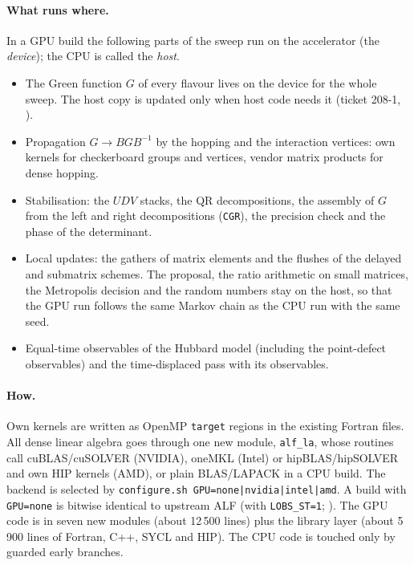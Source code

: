 \paragraph{What runs where.} In a GPU build the following parts of the sweep run on the accelerator (the \emph{device}); the CPU is called the \emph{host}.
\begin{itemize}
\item The Green function $G$ of every flavour lives on the device for the whole sweep. The host copy is updated only when host code needs it (ticket 208-1, ).
\item Propagation $G\to B G B^{-1}$ by the hopping and the interaction vertices: own kernels for checkerboard groups and vertices, vendor matrix products for dense hopping.
\item Stabilisation: the $UDV$ stacks, the QR decompositions, the assembly of $G$ from the left and right decompositions (\texttt{CGR}), the precision check and the phase of the determinant.
\item Local updates: the gathers of matrix elements and the flushes of the delayed and submatrix schemes. The proposal, the ratio arithmetic on small matrices, the Metropolis decision and the random numbers stay on the host, so that the GPU run follows the same Markov chain as the CPU run with the same seed.
\item Equal-time observables of the Hubbard model (including the point-defect observables) and the time-displaced pass with its observables.
\end{itemize}

\paragraph{How.} Own kernels are written as OpenMP \texttt{target} regions in the existing Fortran files. All dense linear algebra goes through one new module, \texttt{alf\_la}, whose routines call cuBLAS/cuSOLVER (NVIDIA), oneMKL (Intel) or hipBLAS/hipSOLVER and own HIP kernels (AMD), or plain BLAS/LAPACK in a CPU build. The backend is selected by \texttt{configure.sh GPU=none|nvidia|intel|amd}. A build with \texttt{GPU=none} is bitwise identical to upstream ALF (with \texttt{LOBS\_ST=1}; ). The GPU code is in seven new modules  (about 12\,500 lines) plus the library layer (about 5\,900 lines of Fortran, C++, SYCL and HIP). The CPU code is touched only by guarded early branches.

